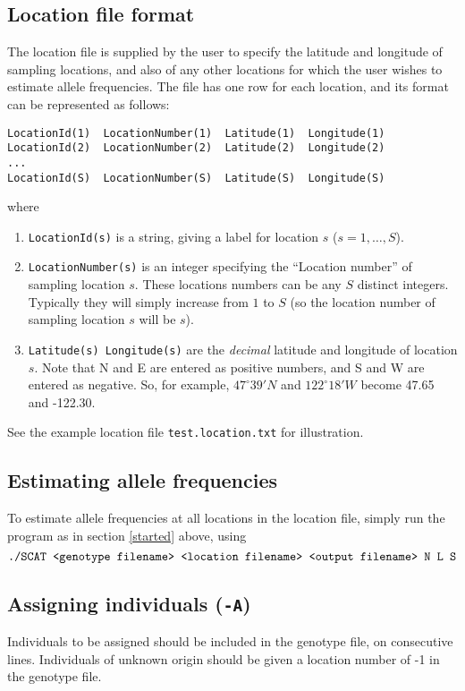 \documentclass[11pt,titlepage,times,letterpaper]{article}
\begin{document}
\subsection{Location file format}

The location file is supplied by the user to specify the latitude and
longitude of sampling locations, and also of any other locations
for which the user wishes to estimate allele frequencies.
The file has one row for each location, and its format 
can be represented as follows:
\begin{verbatim}
LocationId(1)  LocationNumber(1)  Latitude(1)  Longitude(1)
LocationId(2)  LocationNumber(2)  Latitude(2)  Longitude(2)
...
LocationId(S)  LocationNumber(S)  Latitude(S)  Longitude(S)
\end{verbatim}
where
\begin{enumerate}
\item{\tt LocationId(s)} is a string, giving a label for location $s$
($s = 1,\dots,S$).
\item{\tt LocationNumber(s)} is an integer specifying the ``Location
number'' of sampling location $s$. These locations numbers can be
any $S$ distinct integers. Typically they will simply increase from $1$ to $S$
(so the location number of sampling location $s$ will be $s$). 
\item{{\tt Latitude(s) Longitude(s)}} are the {\it decimal} latitude
and longitude of location $s$. Note that N and E are entered as
positive numbers, and S and W are entered as negative. So, for
example, $47^\circ 39' N$ and $122^\circ 18' W$ become 47.65 and -122.30.
\end{enumerate}
See the example location file {\tt test.location.txt} for illustration.

\subsection{Estimating allele frequencies}

To estimate allele frequencies at all locations in the location
file, simply run the program as in section \ref{started} above,
using
$$\text{{\tt ./SCAT <genotype filename> <location filename> <output
filename> N L S}}$$

\subsection{Assigning individuals ({\tt -A})} \label{assign}

Individuals to be assigned should be included in the genotype file, on
consecutive lines. Individuals of unknown origin should be given a
location number of -1 in the genotype file.  
\end{document}

